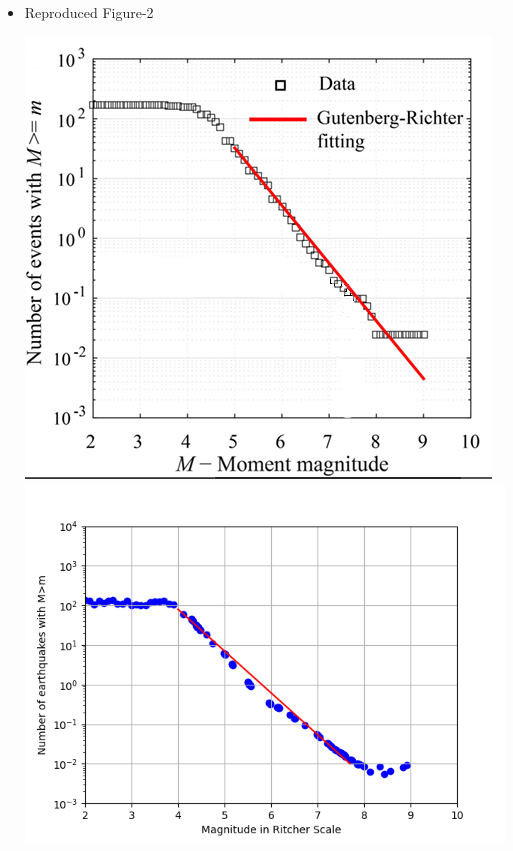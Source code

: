 \documentclass{article}
\begin{document}
\begin{itemize}
  \newpage
\item Reproduced Figure-2

  \includegraphics[scale =0.6]{gr fitting.PNG} \includegraphics[scale=0.6]{repgr.png}


\end{itemize}
\end{document}
